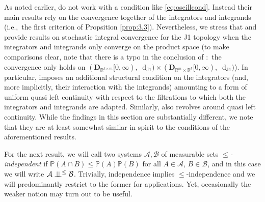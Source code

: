 \documentclass[11pt]{article}
\theoremstyle{definition}\newtheorem{example}[theorem]{Example}
\theoremstyle{definition}\newtheorem{counterexample}[theorem]{Counterexample}
\theoremstyle{definition}\newtheorem{remark}[theorem]{Remark}
\theoremstyle{definition}\newtheorem{defi}[theorem]{Definition}
\numberwithin{equation}{section}
\newcommand*\diff{\mathop{}\!\mathrm{d}}								%
\newcommand{\Pro}{\mathbb{P}}										%
\newcommand{\indep}{\perp \!\!\! \perp}									%
\renewcommand{\|}{\; : \, \;}											%
\newcommand{\dJ}{\diff_{\operatorname{J1}}}								%
\begin{document}
As noted  earlier, \cite{jakubowskimeminpages,kurtzprotter} do not work with a condition like \eqref{eq:oscillcond}. Instead their main results rely on the convergence together of the integrators and integrands (i.e.,~the first criterion of Propsition \ref{prop:3.3}). Nevertheless, we stress that \cite[Thm 5.1]{jakubowskimeminpages} and \cite[Thm 4.6]{kurtzprotter} provide results on stochastic integral convergence for the J1 topology when the integrators and integrands only converge on the product space (to make comparisons clear, note that there is a typo in the conclusion of \cite[Thm 4.6]{kurtzprotter}:~the convergence only holds on $(\mathbf{D}_{\mathbb{R}^{k\times m}}[0,\infty),\dJ)\times (\mathbf{D}_{\mathbb{R}^{m}\times \mathbb{R}^{k}}[0,\infty),\dJ)$). In particular, \cite[Thm 4.6]{kurtzprotter} imposes an additional structural condition on the integrators (and, more implicitly, their interaction with the integrands) amounting to a form of uniform quasi left continuity with respect to the filtrations to which both the integrators and integrands are adapted. Similarly, \cite[Thm 5.1]{jakubowskimeminpages} also revolves around quasi left continuity. While the findings in this section are substantially different, we note that they are at least somewhat similar in spirit to the conditions of the aforementioned results.

For the next result, we will call two systems $\mathcal{A}, \mathcal{B}$ of measurable sets  \emph{{\footnotesize $\le$}-independent} if $\Pro(A\cap B) \le \Pro(A) \Pro(B)$ for all $A \in \mathcal{A}$, $B \in \mathcal{B}$, and in this case we will write $\mathcal{A} \indep^{\footnotesize \le} \mathcal{B}$. Trivially, independence implies {\footnotesize $\le$}-independence and we will predominantly restrict to the former for applications. Yet, occasionally the weaker notion may turn out to be useful.
\end{document}

